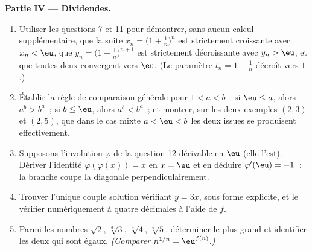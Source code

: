\begin{problem}
\medskip
\noindent\textbf{Partie IV --- Dividendes.}
\begin{enumerate}[resume]
  \item Utiliser les questions 7 et 11 pour démontrer, sans aucun
        calcul supplémentaire, que la suite $x_n = \bigl(1 +
        \frac1n\bigr)^n$ est strictement croissante avec $x_n < \eu$,
        que $y_n = \bigl(1 + \frac1n\bigr)^{n+1}$ est strictement
        décroissante avec $y_n > \eu$, et que toutes deux convergent
        vers $\eu$. (Le paramètre $t_n = 1 + \frac1n$ décroît vers
        $1$.)
  \item Établir la règle de comparaison générale pour $1 < a < b$~:
        si $\eu \leq a$, alors $a^b > b^a$~; si $b \leq \eu$, alors
        $a^b < b^a$~; et montrer, sur les deux exemples $(2, 3)$ et
        $(2, 5)$, que dans le cas mixte $a < \eu < b$ les deux
        issues se produisent effectivement.
  \item Supposons l'involution $\varphi$ de la question 12
        dérivable en $\eu$ (elle l'est). Dériver l'identité
        $\varphi(\varphi(x)) = x$ en $x = \eu$ et en déduire
        $\varphi'(\eu) = -1$~: la branche coupe la diagonale
        perpendiculairement.
  \item Trouver l'unique couple solution vérifiant $y = 3x$, sous
        forme explicite, et le vérifier numériquement à quatre
        décimales à l'aide de $f$.
  \item Parmi les nombres $\sqrt2$, $\sqrt[3]3$, $\sqrt[4]4$,
        $\sqrt[5]5$, déterminer le plus grand et identifier les deux
        qui sont égaux. \emph{(Comparer $n^{1/n} =
        \eu^{f(n)}$.)}
\end{enumerate}


\end{problem}
